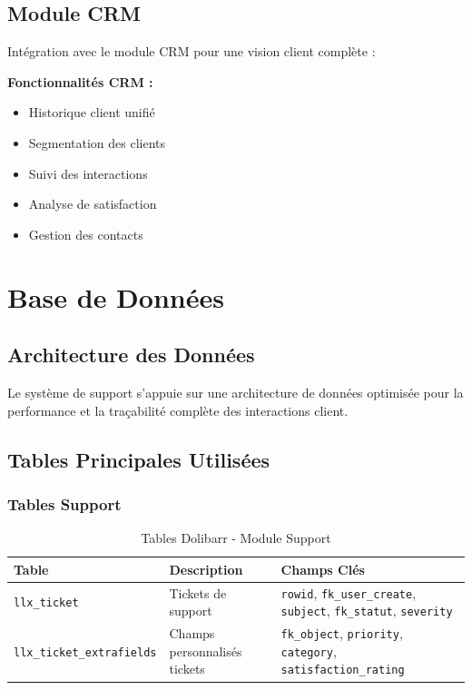 \documentclass[12pt,a4paper]{report}
\begin{document}
\subsection{Module CRM}
Intégration avec le module CRM pour une vision client complète :

\textbf{Fonctionnalités CRM :}
\begin{itemize}
\item Historique client unifié
\item Segmentation des clients
\item Suivi des interactions
\item Analyse de satisfaction
\item Gestion des contacts
\end{itemize}

\section{Base de Données}
\subsection{Architecture des Données}
Le système de support s'appuie sur une architecture de données optimisée pour la performance et la traçabilité complète des interactions client.

\subsection{Tables Principales Utilisées}

\subsubsection{Tables Support}
\begin{table}[H]
\centering
\begin{tabularx}{\textwidth}{|X|X|X|}
\hline
\textbf{Table} & \textbf{Description} & \textbf{Champs Clés} \\
\hline
\texttt{llx\_ticket} & Tickets de support & \texttt{rowid}, \texttt{fk\_user\_create}, \texttt{subject}, \texttt{fk\_statut}, \texttt{severity} \\
\hline
\texttt{llx\_ticket\_extrafields} & Champs personnalisés tickets & \texttt{fk\_object}, \texttt{priority}, \texttt{category}, \texttt{satisfaction\_rating} \\
\hline

\hline
\end{tabularx}
\caption{Tables Dolibarr - Module Support}
\end{table}
\end{document}
